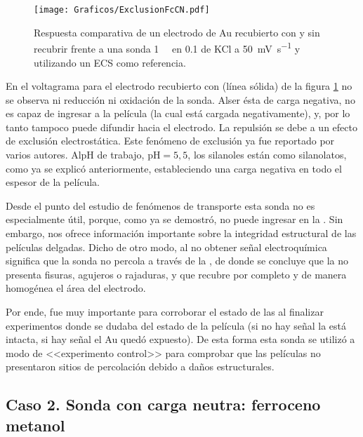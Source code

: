 			\begin{figure}[ht]
				\centering
		 	    \texttt{[image: Graficos/ExclusionFcCN.pdf]}
		        \caption[Exclusión electrostática en \pdmF]{Respuesta comparativa de un electrodo de Au recubierto con \pdmF\space y sin recubrir frente a una sonda \fe\space \SI{1}{\milli\Molar} en \SI{0.1}{\Molar} de KCl a \SI{50}{\milli\volt\per\second} y utilizando un ECS como referencia.}
		        \label{fig:exclusion_vs_Au}
		      	\end{figure}
	
	 En el voltagrama para el electrodo recubierto con \pdmF\space (línea sólida) de la figura \ref{fig:exclusion_vs_Au} no se observa ni reducción ni oxidación de la sonda. Al\space ser ésta de carga negativa, no es capaz de ingresar a la película (la cual está cargada negativamente), y, por lo tanto tampoco puede difundir hacia el electrodo. La repulsión se debe a un efecto de exclusión electrostática. Este fenómeno de exclusión ya fue reportado por varios autores\cite{alberti2015,schmuhl2005,Andrieu-Brunsen2015,brunsen2011}. Al\space pH de trabajo, $\text{pH}=5,5$, los silanoles están como silanolatos, como ya se explicó anteriormente, estableciendo una carga negativa en todo el espesor de la película.
  
	 Desde el punto del estudio de fenómenos de  transporte esta sonda no es especialmente útil, porque, como ya se demostró, no puede ingresar en la \pdm. Sin embargo, nos ofrece información importante sobre la integridad estructural de las películas delgadas. Dicho de otro modo, al no obtener señal electroquímica significa que la sonda no percola a través de la \pdm, de donde se concluye que la \pdm\space no presenta fisuras, agujeros o rajaduras, y que recubre por completo y de manera homogénea el área del electrodo. 

	 Por ende, fue muy importante para corroborar el estado de las \pdm\space al finalizar experimentos donde se dudaba del estado de la película (si no hay señal la \pdm\space está intacta, si hay señal el Au quedó expuesto). De esta forma esta sonda se utilizó a modo de <<experimento control>> para comprobar que las películas no presentaron sitios de percolación debido a daños estructurales.

	\subsection{Caso 2. Sonda con carga neutra: ferroceno metanol}

